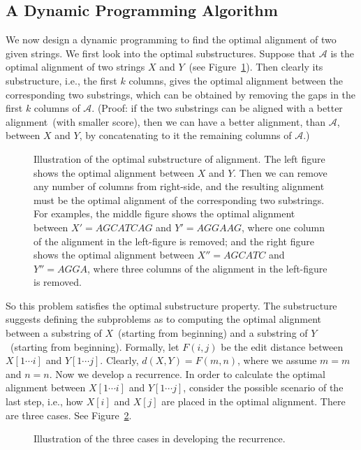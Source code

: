 \subsection*{A Dynamic Programming Algorithm}

We now design a dynamic programming to find the optimal alignment of two given strings.
We first look into the optimal substructures. Suppose that $\mathcal{A}$ is the optimal
alignment of two strings $X$ and $Y$~(see Figure~\ref{fig:optimal}).
Then clearly its substructure, i.e., the first $k$ columns, gives the optimal
alignment between the corresponding two substrings, which can be obtained by removing
the gaps in the first $k$ columns of $\mathcal{A}$.
(Proof: if the two substrings can be aligned with
a better alignment~(with smaller score), then we can have
a better alignment, than $\mathcal{A}$, between $X$ and $Y$,
by concatenating to it the remaining columns of $\mathcal{A}$.)

\begin{figure}[h]
\centering{}
\caption{Illustration of the optimal substructure of alignment.
The left figure shows the optimal alignment between $X$ and $Y$.
Then we can remove any number of columns from right-side, and the resulting
alignment must be the optimal alignment of the corresponding two substrings.
For examples, the middle figure shows the optimal alignment between $X' = AGCATCAG$ and $Y' = AGGAAG$,
where one column of the alignment in the left-figure is removed;
and the right figure shows the optimal alignment between $X'' = AGCATC$ and $Y'' = AGGA$,
where three columns of the alignment in the left-figure is removed.}
\label{fig:optimal}
\end{figure}

So this problem satisfies the optimal substructure property.
The substructure suggests defining the subproblems as to computing the optimal
alignment between a substring of $X$~(starting from beginning) and 
a substring of $Y$~(starting from beginning).
Formally, let $F(i,j)$ be the edit distance between $X[1\cdots i]$ and $Y[1\cdots j]$.
Clearly, $d(X, Y) = F(m,n)$, where we assume $m = m$ and $n = n$.
Now we develop a recurrence. In order to calculate the optimal alignment between $X[1\cdots i]$
and $Y[1\cdots j]$, consider the possible scenario of the last step, i.e., how $X[i]$ and $X[j]$
are placed in the optimal alignment. There are three cases. See Figure~\ref{fig:recurrence}.

\begin{figure}[h]
\centering{}
\caption{Illustration of the three cases in developing the recurrence.}
\label{fig:recurrence}
\end{figure}



